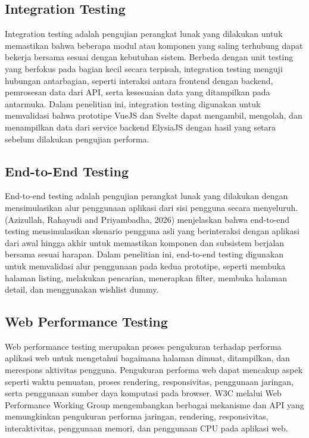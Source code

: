 \documentclass[12pt,a4paper]{report}
\begin{document}
\subsection{Integration Testing}
Integration testing adalah pengujian perangkat lunak yang dilakukan untuk memastikan bahwa beberapa modul atau komponen yang saling terhubung dapat bekerja bersama sesuai dengan kebutuhan sistem. Berbeda dengan unit testing yang berfokus pada bagian kecil secara terpisah, integration testing menguji hubungan antarbagian, seperti interaksi antara frontend dengan backend, pemrosesan data dari API, serta kesesuaian data yang ditampilkan pada antarmuka. Dalam penelitian ini, integration testing digunakan untuk memvalidasi bahwa prototipe VueJS dan Svelte dapat mengambil, mengolah, dan menampilkan data dari service backend ElysiaJS dengan hasil yang setara sebelum dilakukan pengujian performa.

\subsection{End-to-End Testing}
End-to-end testing adalah pengujian perangkat lunak yang dilakukan dengan mensimulasikan alur penggunaan aplikasi dari sisi pengguna secara menyeluruh. (Azizullah, Rahayudi and Priyambadha, 2026) menjelaskan bahwa end-to-end testing mensimulasikan skenario pengguna asli yang berinteraksi dengan aplikasi dari awal hingga akhir untuk memastikan komponen dan subsistem berjalan bersama sesuai harapan. Dalam penelitian ini, end-to-end testing digunakan untuk memvalidasi alur penggunaan pada kedua prototipe, seperti membuka halaman listing, melakukan pencarian, menerapkan filter, membuka halaman detail, dan menggunakan wishlist dummy.

\subsection{Web Performance Testing}
Web performance testing merupakan proses pengukuran terhadap performa aplikasi web untuk mengetahui bagaimana halaman dimuat, ditampilkan, dan merespons aktivitas pengguna. Pengukuran performa web dapat mencakup aspek seperti waktu pemuatan, proses rendering, responsivitas, penggunaan jaringan, serta penggunaan sumber daya komputasi pada browser. W3C melalui Web Performance Working Group mengembangkan berbagai mekanisme dan API yang memungkinkan pengukuran performa jaringan, rendering, responsivitas, interaktivitas, penggunaan memori, dan penggunaan CPU pada aplikasi web.
\end{document}
